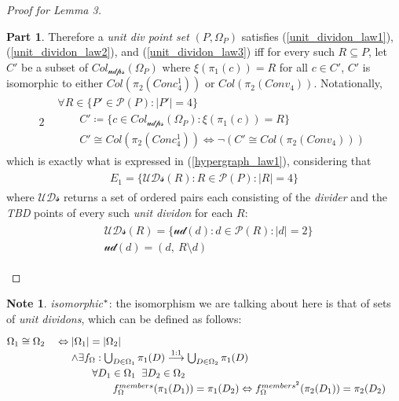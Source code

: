 \documentclass[11pt, oneside]{article}      %
\theoremstyle{definition}
\newtheorem*{note}{Note}
\newtheorem{proofpart}{Part}[theo]
\numberwithin{equation}{section}
\newcommand{\reff}[1]{(\ref{#1})}
\theoremstyle{c}
\begin{document}
\begin{proof}[Proof for Lemma 3]
\begin{proofpart}
Therefore a \textit{unit div point set} $(P, \Omega_P)$ satisfies \reff{unit_dividon_law1}, \reff{unit_dividon_law2}, and \reff{unit_dividon_law3} iff for every such $R \subseteq P$, let $C'$ be a subset of $Col_{\mathscr{udps}}(\Omega_P)$ where $\xi(\pi_1(c)) = R$ for all $c \in C'$, $C'$ is isomorphic to either $Col(\pi_2(Conc_4^1))$ or $Col(\pi_2(Conv_4))$. Notationally, 
\begin{alignat}{2}
\begin{aligned}
&\forall R \in \{ P' \in \mathcal{P}(P) : |P'| = 4 \} \\
&\qquad  C' \coloneqq \{ c \in Col_{\mathscr{udps}}(\Omega_P) : \xi(\pi_1(c))= R\} \\
&\qquad C' \cong Col(\pi_2(Conc_4^1)) \Leftrightarrow \neg ( C' \cong Col(\pi_2(Conv_4)) )
\end{aligned}
\end{alignat}
which is exactly what is expressed in \reff{hypergraph_law1}, considering that
\begin{align}\begin{split}
E_1 = \{ \mathscr{UDs}(R) : R \in \mathcal{P}(P) : |R| = 4 \} 
\end{split}
\end{align}
where $\mathscr{UDs}$ returns a set of ordered pairs each consisting of the \textit{divider} and the \textit{TBD} points of every such \textit{unit dividon} for each $R$:
\begin{align}\begin{split}\label{uds}
&\mathscr{UDs}(R) = \{ \mathscr{ud}(d) : d \in \mathcal{P}(R) : |d| = 2 \}\\
&\mathscr{ud}(d) = (d,\ R \setminus d)
\end{split}
\end{align}
\end{proofpart}

\end{proof}
\begin{note}
\textit{isomorphic$\color{black}^*$}: the isomorphism we are talking about here is that of sets of \textit{unit dividons}, which can be defined as follows:
\begin{alignat}{2}
  &\Omega_1 \cong\Omega_2 && \Leftrightarrow \begin{aligned}[t] \renewcommand\arraystretch{1.25}\begin{array}[t]{@{\hskip0em}l}
  |\Omega_1| = |\Omega_2| \\
  \land \exists f_{\Omega}: \bigcup_{D \in \Omega_1} \pi_1(D) \stackrel{\rm{1:1}}{\longrightarrow} \bigcup_{D \in \Omega_2} \pi_1(D)\\
 \qquad\forall D_1 \in \Omega_1 \; \; \exists D_2 \in \Omega_2 \\
 \qquad\qquad f_{\Omega}^{members}(\pi_1(D_1)) = \pi_1(D_2) \Leftrightarrow f_{\Omega}^{members^{2}}(\pi_2(D_1)) = \pi_2(D_2) \\
  \end{array}
  \end{aligned}
\end{alignat}
\end{note}
\end{document}

